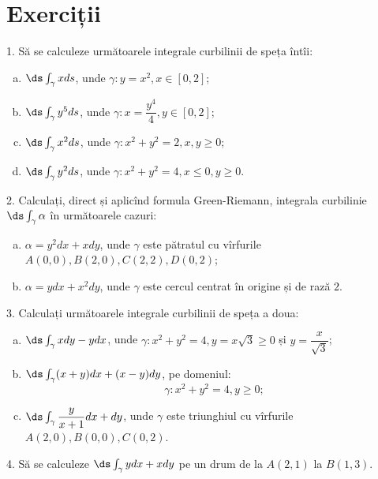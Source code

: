 \section{Exerciții}
1. Să se calculeze următoarele integrale curbilinii de speța întîi:
\begin{enumerate}[(a)]
\item $ \ds\int_\gamma xds $, unde $ \gamma : y = x^2, x \in [0, 2] $;
\item $ \ds\int_\gamma y^5ds $, unde $ \gamma : x = \dfrac{y^4}{4}, y \in [0, 2] $;
\item $ \ds\int_\gamma x^2ds $, unde $ \gamma: x^2 + y^2 = 2, x, y \geq 0 $;
\item $ \ds\int_\gamma y^2ds $, unde $ \gamma: x^2 + y^2 = 4, x \leq 0, y \geq 0 $.
\end{enumerate}

\vspace{1cm}

2. Calculați, direct și aplicînd formula Green-Riemann, integrala curbilinie
$ \ds\int_\gamma \alpha $ în următoarele cazuri:
\begin{enumerate}[(a)]
\item $ \alpha = y^2 dx + x dy $, unde $ \gamma $ este pătratul cu vîrfurile
  $ A(0,0), B(2, 0), C(2, 2), D(0, 2) $;
\item $ \alpha = ydx + x^2 dy $, unde $ \gamma $ este cercul centrat în origine
  și de rază $ 2 $.
\end{enumerate}

\vspace{1cm}

3. Calculați următoarele integrale curbilinii de speța a doua:
\begin{enumerate}[(a)]
\item $ \ds\int_\gamma xdy - ydx $, unde $ \gamma: x^2 + y^2 = 4, y = x\sqrt{3} \geq 0 $
  și $ y = \dfrac{x}{\sqrt{3}} $;
\item $ \ds\int_\gamma (x + y) dx + (x - y) dy $, pe domeniul:
  \[
    \gamma: x^2 + y^2 = 4, y \geq 0;
  \]
\item $ \ds\int_\gamma \dfrac{y}{x + 1} dx + dy $, unde $ \gamma $ este
  triunghiul cu vîrfurile $ A(2, 0), B(0, 0), C(0, 2) $.
\end{enumerate}

\vspace{1cm}

4. Să se calculeze $ \ds\int_\gamma ydx + xdy $ pe un drum de la $ A(2, 1) $
la $ B(1, 3) $.

